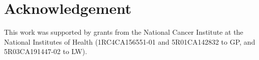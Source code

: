 \documentclass{bioinfo}
\begin{document}





\section{Acknowledgement}

This work was supported by grants from the National Cancer Institute
at the National Institutes of Health (1RC4CA156551-01 and 5R01CA142832
to GP, and 5R03CA191447-02 to LW).




\end{document}

